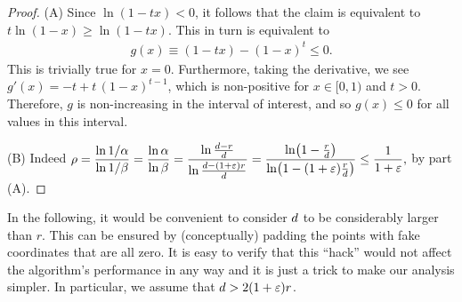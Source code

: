 \begin{proof}
    (A) Since $\ln (1-tx) < 0$, it follows that the claim is
    equivalent to $t\ln(1-x)\geq\ln(1-tx)$.  This in turn is
    equivalent to
    \begin{align*}
        g(x)\equiv(1-tx)-(1-x)^t\leq0.
    \end{align*}
    This is trivially true for $x=0$.  Furthermore, taking the
    derivative, we see $g'(x) = -t + t\,(1-x)^{t-1}$, which is
    non-positive for $x\in[0,1)$ and $t > 0$.  Therefore, $g$ is
    non-increasing in the interval of interest, and so $g(x) \leq 0$
    for all values in this interval.

    (B)
    Indeed
    \begin{math}
        \ds \rho%
        =%
        \frac{\ln{1/\alpha}}{\ln{1/\beta}}%
        =%
        \frac{\ln{\alpha}}{\ln{\beta}}%
        =%
        \frac{\ln \frac{\hdim-r}{\hdim}}{\ln
           \frac{\hdim-(1+\eps)r}{\hdim}}%
        =%
        \frac{\ln \pth{ 1 - \frac{r}{\hdim}}}{\ln \pth{1 -
              (1+\eps)\frac{r}{\hdim}}}%
        \leq%
        \frac{1}{1+\eps},
    \end{math}
    by part (A).
\end{proof}


In the following, it would be convenient to consider $d$ to be
considerably larger than $r$. This can be ensured by (conceptually)
padding the points with fake coordinates that are all zero.  It is
easy to verify that this ``hack'' would not affect the algorithm's
performance in any way and it is just a trick to make our analysis
simpler.  In particular, we assume that $d > 2 (1+{\varepsilon})r$.

